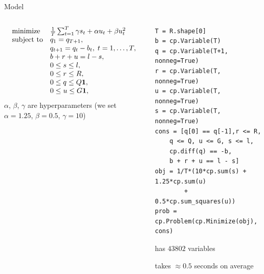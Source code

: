 \documentclass[aspectratio=169,11pt]{beamer}
\begin{document}
\begin{frame}[fragile]{Model}
    \begin{columns}
        \begin{column}{0.46\textwidth}
    \[
        \begin{array}{ll}
            \mbox{minimize}   &  \frac{1}{T}\sum_{t=1}^{T} \gamma s_t + \alpha u_t + \beta u_t^2 \\
            \mbox{subject to} & q_1 = q_{T+1}, \\
            & q_{t+1} = q_t - b_t, \; t = 1, \ldots, T, \\
            & b + r + u = l-s, \\
            & 0 \leq s \leq l, \\
            & 0 \leq r \leq R, \\
            & 0 \leq q \leq Q \mathbf 1, \\
            & 0 \leq u \leq G \mathbf 1, \\
        \end{array}
    \]
    $\alpha$, $\beta$, $\gamma$ are hyperparameters
    (we set $\alpha = 1.25$, $\beta = 0.5$, $\gamma = 10$)
    \vfill
    \end{column}
    \begin{column}{0.54\textwidth}
    \vfill
\begin{lstlisting}[language=mypython, basicstyle=\footnotesize\ttfamily, belowskip=0em]
T = R.shape[0]
b = cp.Variable(T)
q = cp.Variable(T+1, nonneg=True)
r = cp.Variable(T, nonneg=True)
u = cp.Variable(T, nonneg=True)
s = cp.Variable(T, nonneg=True)
cons = [q[0] == q[-1],r <= R,
    q <= Q, u <= G, s <= l,
    cp.diff(q) == -b,
    b + r + u == l - s]
obj = 1/T*(10*cp.sum(s) + 1.25*cp.sum(u) 
        + 0.5*cp.sum_squares(u))
prob = cp.Problem(cp.Minimize(obj), cons)
\end{lstlisting}
    \BIT
    \item has $43802$ variables
    \item takes $\approx0.5$ seconds on average
    \EIT
    \end{column}
    \end{columns}
\end{frame}
\end{document}
